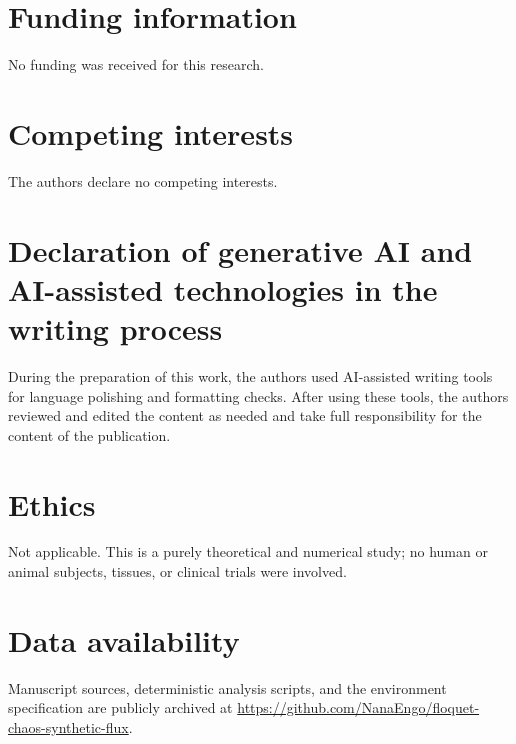 \documentclass[preprint,numbers,a4paper]{elsarticle}
\begin{document}
\section*{Funding information}
No funding was received for this research.

\section*{Competing interests}
The authors declare no competing interests.

\section*{Declaration of generative AI and AI-assisted technologies in the writing process}
During the preparation of this work, the authors used AI-assisted writing tools for language polishing and formatting checks. After using these tools, the authors reviewed and edited the content as needed and take full responsibility for the content of the publication.

\section*{Ethics}
Not applicable. This is a purely theoretical and numerical study; no human or animal subjects, tissues, or clinical trials were involved.

\section*{Data availability}
Manuscript sources, deterministic analysis scripts, and the environment specification are publicly archived at \url{https://github.com/NanaEngo/floquet-chaos-synthetic-flux}.


\end{document}
